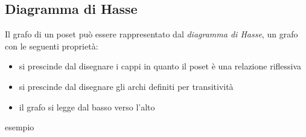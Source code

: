 \subsection{Diagramma di Hasse}
Il grafo di un poset può essere rappresentato dal \emph{diagramma di Hasse}, un grafo
con le seguenti proprietà:
\begin{itemize}
    \item si prescinde dal disegnare i cappi in quanto il poset è una relazione riflessiva
    \item si prescinde dal disegnare gli archi definiti per transitività
    \item il grafo si legge dal basso verso l'alto
\end{itemize}

esempio
